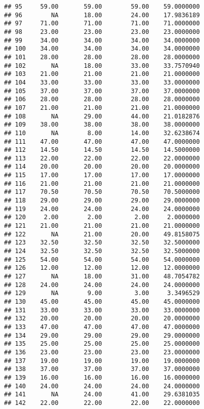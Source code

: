 \documentclass[
]{article}
\begin{document}
\begin{verbatim}
## 95     59.00       59.00        59.00    59.0000000
## 96        NA       18.00        24.00    17.9836189
## 97     71.00       71.00        71.00    71.0000000
## 98     23.00       23.00        23.00    23.0000000
## 99     34.00       34.00        34.00    34.0000000
## 100    34.00       34.00        34.00    34.0000000
## 101    28.00       28.00        28.00    28.0000000
## 102       NA       18.00        33.00    33.7570940
## 103    21.00       21.00        21.00    21.0000000
## 104    33.00       33.00        33.00    33.0000000
## 105    37.00       37.00        37.00    37.0000000
## 106    28.00       28.00        28.00    28.0000000
## 107    21.00       21.00        21.00    21.0000000
## 108       NA       29.00        44.00    21.0182876
## 109    38.00       38.00        38.00    38.0000000
## 110       NA        8.00        14.00    32.6238674
## 111    47.00       47.00        47.00    47.0000000
## 112    14.50       14.50        14.50    14.5000000
## 113    22.00       22.00        22.00    22.0000000
## 114    20.00       20.00        20.00    20.0000000
## 115    17.00       17.00        17.00    17.0000000
## 116    21.00       21.00        21.00    21.0000000
## 117    70.50       70.50        70.50    70.5000000
## 118    29.00       29.00        29.00    29.0000000
## 119    24.00       24.00        24.00    24.0000000
## 120     2.00        2.00         2.00     2.0000000
## 121    21.00       21.00        21.00    21.0000000
## 122       NA       21.00        20.00    49.8158075
## 123    32.50       32.50        32.50    32.5000000
## 124    32.50       32.50        32.50    32.5000000
## 125    54.00       54.00        54.00    54.0000000
## 126    12.00       12.00        12.00    12.0000000
## 127       NA       18.00        31.00    48.7054782
## 128    24.00       24.00        24.00    24.0000000
## 129       NA        9.00         3.00     3.3496529
## 130    45.00       45.00        45.00    45.0000000
## 131    33.00       33.00        33.00    33.0000000
## 132    20.00       20.00        20.00    20.0000000
## 133    47.00       47.00        47.00    47.0000000
## 134    29.00       29.00        29.00    29.0000000
## 135    25.00       25.00        25.00    25.0000000
## 136    23.00       23.00        23.00    23.0000000
## 137    19.00       19.00        19.00    19.0000000
## 138    37.00       37.00        37.00    37.0000000
## 139    16.00       16.00        16.00    16.0000000
## 140    24.00       24.00        24.00    24.0000000
## 141       NA       24.00        41.00    29.6381035
## 142    22.00       22.00        22.00    22.0000000

\end{verbatim}
\end{document}
